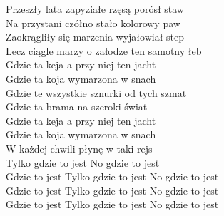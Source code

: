 Przeszły lata zapyziałe rzęsą porósł staw \\
Na przystani czółno stało kolorowy paw \\
Zaokrągliły się marzenia wyjałowiał step \\
Lecz ciągle marzy o załodze ten samotny łeb \\


Gdzie ta keja a przy niej ten jacht \\
Gdzie ta koja wymarzona w snach \\
Gdzie te wszystkie sznurki od tych szmat \\
Gdzie ta brama na szeroki świat \\
Gdzie ta keja a przy niej ten jacht \\
Gdzie ta koja wymarzona w snach \\
W każdej chwili płynę w taki rejs \\
Tylko gdzie to jest No gdzie to jest \\
Gdzie to jest Tylko gdzie to jest No gdzie to jest \\
Gdzie to jest Tylko gdzie to jest No gdzie to jest \\
Gdzie to jest Tylko gdzie to jest No gdzie to jest
